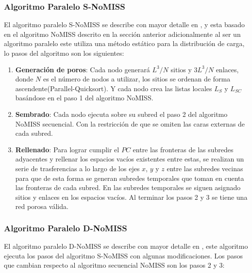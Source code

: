 \subsubsection{Algoritmo Paralelo S-NoMISS}
\label{subsubsec:ps-nomiss}
El algoritmo paralelo S-NoMISS se describe con mayor detalle en \cite{ref3}, y esta basado en el algoritmo NoMISS descrito en la sección anterior adicionalmente al ser un algoritmo paralelo este utiliza una método estático para la distribución de carga, lo pasos del algoritmo son los siguientes:

\begin{enumerate}
\item \textbf{Generación de poros}: Cada nodo generará $L^3/N$ sitios y $3L^3/N$ enlaces, donde $N$ es el número de nodos a utilizar, los sitios se ordenan de forma ascendente(Parallel-Quicksort). Y cada nodo crea las listas locales $L_S$ y $L_{SC}$ basándose en el paso 1 del algoritmo NoMISS.

\item \textbf{Sembrado}: Cada nodo ejecuta sobre su subred el paso 2 del algoritmo NoMISS secuencial. Con la restricción de que se omiten las caras externas de cada subred.

\item \textbf{Rellenado}: Para lograr cumplir el $PC$ entre las fronteras de las subredes adyacentes y rellenar los espacios vacíos existentes entre estas, se realizan un serie de trasferencias a lo largo de los ejes $x$, $y$ y $z$ entre las subredes vecinas para que de esta forma se generan subredes temporales que toman en cuenta las fronteras de cada subred. En las subredes temporales se siguen asignado sitios y enlaces en los espacios vacíos. Al terminar los pasos 2 y 3 se tiene una red porosa válida.
\end{enumerate}

\subsubsection{Algoritmo Paralelo D-NoMISS}
\label{subsubsec:pd-nomiss}
El algoritmo paralelo D-NoMISS se describe con mayor detalle en \cite{ref4}, este algoritmo ejecuta los pasos del algoritmo S-NoMISS con algunas modificaciones. Los pasos que cambian respecto al algoritmo secuencial NoMISS son los pasos 2 y 3:

